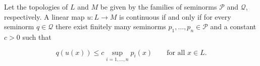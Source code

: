 Let the topologies of $L$ and $M$ be given by the families of seminorms $\mathcal{P}$ and $\mathcal{Q}$, respectively. A linear map $u: L \to M$ is continuous if and only if for every seminorm $q \in \mathcal{Q}$ there exist finitely many seminorms $p_1, \ldots, p_n \in \mathcal{P}$ and a constant $c > 0$ such that

$$q(u(x)) \leq c \sup_{i=1,\ldots,n} p_i(x) \qquad \text{for all } x \in L.$$
